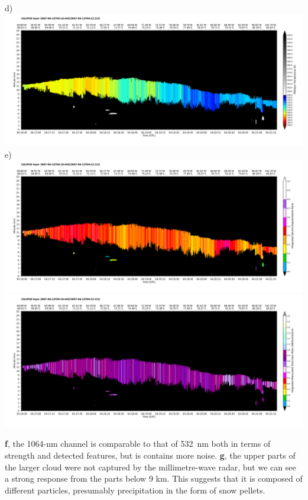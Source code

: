 \noindent\textsf{\small d)}\\
\includegraphics[width=150mm,clip,trim=10mm 10mm 4mm 4mm]{images/antarctica/1calipso-temperature-layer.pdf}\\
\noindent\textsf{\small e)}\\
\includegraphics[width=150mm,clip,trim=10mm 10mm 4mm 4mm]{images/antarctica/1calipso-dratio-layer.pdf}\\
\includegraphics[width=150mm,clip,trim=10mm 10mm 4mm 4mm]{images/antarctica/1calipso-cratio-layer.pdf}

\clearpage
\noindent
\textbf{f}, the 1064-nm channel is comparable to that of \SI{532}{nm} both in
terms of strength and detected features,
but is contains more noise. \textbf{g}, the upper parts of the larger cloud were not captured by
the millimetre-wave radar, but we can see a strong response from the parts below 9 km. This suggests that
it is composed of different
particles, presumably precipitation in the form of snow pellets.
\vspace{3mm}

